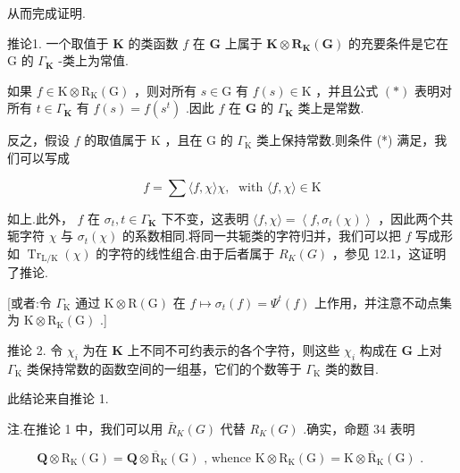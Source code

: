 \documentclass[10pt]{article}
\begin{document}
从而完成证明.

推论1. 一个取值于 \(\mathbf{K}\) 的类函数 \(f\) 在 \(\mathbf{G}\) 上属于 \(\mathbf{K} \otimes  {\mathbf{R}}_{\mathbf{K}}\left( \mathbf{G}\right)\) 的充要条件是它在 \(\mathrm{G}\) 的 \({\Gamma }_{\mathbf{K}}\) -类上为常值.

如果 \(f \in  \mathrm{K} \otimes  {\mathrm{R}}_{\mathrm{K}}\left( \mathrm{G}\right)\) ，则对所有 \(s \in  \mathrm{G}\) 有 \(f\left( s\right)  \in  \mathrm{K}\) ，并且公式 \(\left( *\right)\) 表明对所有 \(t \in  {\Gamma }_{\mathbf{K}}\) 有 \(f\left( s\right)  = f\left( {s}^{t}\right)\) .因此 \(f\) 在 \(\mathbf{G}\) 的 \({\Gamma }_{\mathbf{K}}\) 类上是常数.

反之，假设 \(f\) 的取值属于 \(\mathrm{K}\) ，且在 G 的 \({\Gamma }_{\mathrm{K}}\) 类上保持常数.则条件 (*) 满足，我们可以写成

\[
f = \sum \langle f,\chi \rangle \chi ,\;\text{ with }\langle f,\chi \rangle  \in  \mathrm{K}
\]

如上.此外， \(f\) 在 \({\sigma }_{t},t \in  {\Gamma }_{\mathbf{K}}\) 下不变，这表明 \(\langle f,\chi \rangle  = \left\langle  {f,{\sigma }_{t}\left( \chi \right) }\right\rangle\) ，因此两个共轭字符 \(\chi\) 与 \({\sigma }_{t}\left( \chi \right)\) 的系数相同.将同一共轭类的字符归并，我们可以把 \(f\) 写成形如 \({\operatorname{Tr}}_{\mathrm{L}/\mathrm{K}}\left( \chi \right)\) 的字符的线性组合.由于后者属于 \({R}_{K}\left( G\right)\) ，参见 12.1，这证明了推论.

[或者:令 \({\Gamma }_{\mathrm{K}}\) 通过 \(\mathrm{K} \otimes  \mathrm{R}\left( \mathrm{G}\right)\) 在 \(f \mapsto  {\sigma }_{t}\left( f\right)  = {\Psi }^{t}\left( f\right)\) 上作用，并注意不动点集为 \(\mathrm{K} \otimes  {\mathrm{R}}_{\mathrm{K}}\left( \mathrm{G}\right)\) .]

推论 2. 令 \({\chi }_{i}\) 为在 \(\mathbf{K}\) 上不同不可约表示的各个字符，则这些 \({\chi }_{i}\) 构成在 \(\mathbf{G}\) 上对 \({\Gamma }_{\mathrm{K}}\) 类保持常数的函数空间的一组基，它们的个数等于 \({\Gamma }_{\mathrm{K}}\) 类的数目.

此结论来自推论 1.

注.在推论 1 中，我们可以用 \({\bar{R}}_{K}\left( G\right)\) 代替 \({R}_{K}\left( G\right)\) .确实，命题 34 表明

\[
\mathbf{Q} \otimes  {\mathrm{R}}_{\mathrm{K}}\left( \mathrm{G}\right)  = \mathbf{Q} \otimes  {\overline{\mathrm{R}}}_{\mathrm{K}}\left( \mathrm{G}\right) \text{ , whence }\mathrm{K} \otimes  {\mathrm{R}}_{\mathrm{K}}\left( \mathrm{G}\right)  = \mathrm{K} \otimes  {\overline{\mathrm{R}}}_{\mathrm{K}}\left( \mathrm{G}\right) \text{ . }
\]
\end{document}
